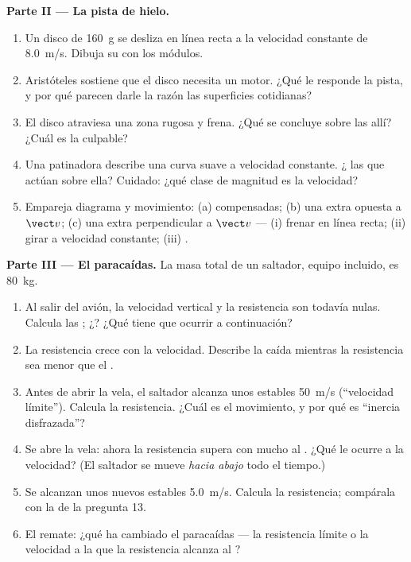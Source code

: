 \begin{problem}
\medskip
\noindent\textbf{Parte II --- La pista de hielo.}
\begin{enumerate}[resume]
  \item Un disco de \qty{160}{g} se desliza en línea recta a la
        velocidad constante de \qty{8.0}{m/s}. Dibuja su  con los módulos.
  \item Aristóteles sostiene que el disco necesita un motor. ¿Qué le
        responde la pista, y por qué parecen darle la razón las
        superficies cotidianas?
  \item El disco atraviesa una zona rugosa y frena. ¿Qué se concluye
        sobre las  allí? ¿Cuál es la culpable?
  \item Una patinadora describe una curva suave a velocidad constante.
        ¿ las  que actúan sobre ella? Cuidado: ¿qué
        clase de magnitud es la velocidad?
  \item Empareja diagrama y movimiento: (a)  compensadas; (b) una
         extra opuesta a $\vect v$; (c) una  extra
        perpendicular a $\vect v$ --- (i) frenar en línea recta; (ii)
        girar a velocidad constante; (iii) .
\end{enumerate}

\medskip
\noindent\textbf{Parte III --- El paracaídas.}
La masa total de un saltador, equipo incluido, es \qty{80}{kg}.
\begin{enumerate}[resume]
  \item Al salir del avión, la velocidad vertical y la resistencia son
        todavía nulas. Calcula las ; ¿? ¿Qué tiene
        que ocurrir a continuación?
  \item La resistencia crece con la velocidad. Describe la caída
        mientras la resistencia sea menor que el .
  \item Antes de abrir la vela, el saltador alcanza unos estables
        \qty{50}{m/s} (``velocidad límite''). Calcula la resistencia.
        ¿Cuál es el movimiento, y por qué es ``inercia disfrazada''?
  \item Se abre la vela: ahora la resistencia supera con mucho al .
        ¿Qué le ocurre a la velocidad? (El saltador se mueve
        \emph{hacia abajo} todo el tiempo.)
  \item Se alcanzan unos nuevos estables \qty{5.0}{m/s}. Calcula la
        resistencia; compárala con la de la pregunta 13.
  \item El remate: ¿qué ha cambiado el paracaídas --- la resistencia
        límite o la velocidad a la que la resistencia alcanza al ?
\end{enumerate}


\end{problem}
